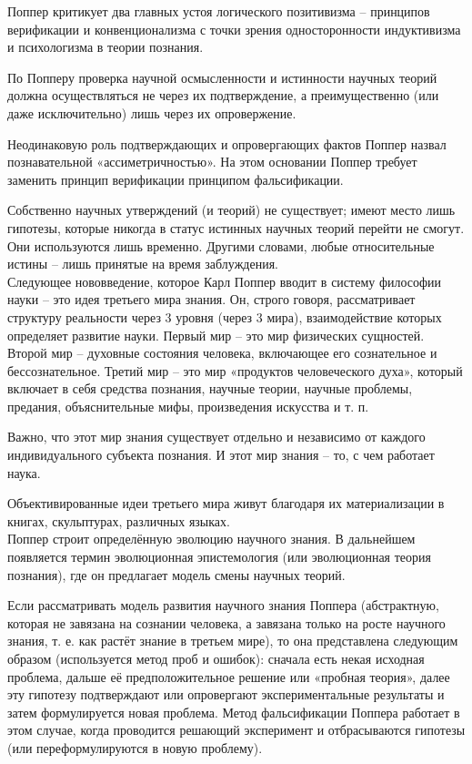 \documentclass[exam_answers.tex]{subfiles}
\begin{document}
\renewcommand{\baselinestretch}{\blch}

Поппер критикует два главных устоя логического позитивизма – принципов верификации и конвенционализма с точки зрения односторонности индуктивизма и психологизма в теории познания.

По Попперу проверка научной осмысленности и истинности научных теорий должна осуществляться не через их подтверждение, а преимущественно (или даже исключительно) лишь через их опровержение.

Неодинаковую роль подтверждающих и опровергающих фактов Поппер назвал познавательной «ассиметричностью».
На этом основании Поппер требует заменить принцип верификации принципом фальсификации.

Собственно научных утверждений (и теорий) не существует; имеют место лишь гипотезы, которые никогда в статус истинных научных теорий перейти не смогут.
Они используются лишь временно.
Другими словами, любые относительные истины – лишь принятые на время заблуждения.
\\

Следующее нововведение, которое Карл Поппер вводит в систему философии науки – это идея третьего мира знания.
Он, строго говоря, рассматривает структуру реальности через 3 уровня (через 3 мира), взаимодействие которых определяет развитие науки.
Первый мир – это мир физических сущностей.
Второй мир – духовные состояния человека, включающее его сознательное и бессознательное.
Третий мир – это мир «продуктов человеческого духа», который включает в себя средства познания, научные теории, научные проблемы, предания, объяснительные мифы, произведения искусства и т. п. 

Важно, что этот мир знания существует отдельно и независимо от каждого индивидуального субъекта познания.
И этот мир знания – то, с чем работает наука.

Объективированные идеи третьего мира живут благодаря их материализации в книгах, скульптурах, различных языках.
\\

Поппер строит определённую эволюцию научного знания.
В дальнейшем появляется термин эволюционная эпистемология (или эволюционная теория познания), где он предлагает модель смены научных теорий.

Если рассматривать модель развития научного знания Поппера (абстрактную, которая не завязана на сознании человека, а завязана только на росте научного знания, т. е. как растёт знание в третьем мире), то она представлена следующим образом (используется метод проб и ошибок): сначала есть некая исходная проблема, дальше её предположительное решение или «пробная теория», далее эту гипотезу подтверждают или опровергают экспериментальные результаты и затем формулируется новая проблема.
Метод фальсификации Поппера работает в этом случае, когда проводится решающий эксперимент и отбрасываются гипотезы (или переформулируются в новую проблему).
\end{document}
